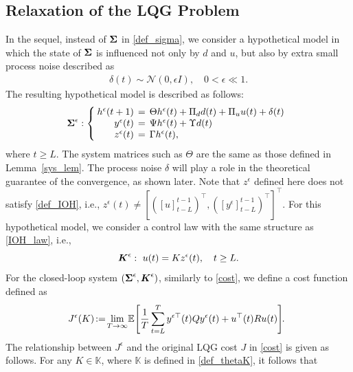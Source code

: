 \documentclass[preprint,5p,times,twocolumn]{elsarticle}
\newcommand{\bm}[1]{{\mbox{\boldmath $#1$}}}
\def\h{\hspace{-0.5mm}}
\def\H{\hspace{-1.0mm}}
\def\hH{\hspace{-1.5mm}}
\def\HH{\hspace{-2.0mm}}
\begin{document}
\subsection{Relaxation of the LQG Problem}
In the sequel, instead of ${\bm \Sigma}$ in \eqref{def_sigma}, we consider a hypothetical model in which the state of ${\bm \Sigma}$ is influenced not only by $d$ and $u$, but also by extra small process noise described as 
\begin{align}\label{perturb}
    \delta(t) \sim \mathcal{N}(0, {\epsilon} I), \quad 0 < {\epsilon} \ll 1. 
\end{align}
The resulting hypothetical model is described as follows: 
\begin{equation}\label{def_sigma_relaxed}
\hspace{-2mm} {\bm \Sigma}^{\epsilon} :  \left\{ \H
\begin{array}{rcl}
    h^{\epsilon}(t+1) &\HH = &\HH \Theta h^{\epsilon}(t) + \Pi_d d(t) + \Pi_u u(t) + \delta(t)\\   
    y^{\epsilon}(t)  &\HH = &\HH \Psi h^{\epsilon}(t) + \Upsilon d(t)\\  
    z^{\epsilon}(t)  &\HH = &\HH \Gamma h^{\epsilon}(t), \\
\end{array}\HH \right.
\end{equation}
where $t \geq L$. The system matrices such as $\Theta$ are the same as those defined in Lemma~\ref{sys_lem}. The process noise $\delta$ will play a role in the theoretical guarantee of the convergence, as shown later. Note that $z^{\epsilon}$ defined here does not satisfy \eqref{def_IOH}, i.e., $z^{\epsilon}(t) \ne [([u]^{t-1}_{t-L})^{\top}, ([y^{\epsilon}]^{t-1}_{t-L})^{\top}]^{\top}$. For this hypothetical model, we consider a control law with the same structure as \eqref{IOH_law}, i.e., 
\begin{equation}\label{IOH_law_relaxed}
    {\bm K}^{\epsilon}:~u(t) = Kz^{\epsilon}(t), \quad t \geq L.
\end{equation}
For the closed-loop system $({\bm \Sigma}^{\epsilon}, {\bm K}^{\epsilon})$, similarly to \eqref{cost}, we define a cost function defined as 
\begin{equation}
    \label{cost_relax}
    \hH J^{\epsilon}(K) \h :=\h \lim_{T \rightarrow \infty}\h {\mathbb E}\h
    \left[\frac{1}{T} 
    \sum_{t=L}^{T}y^{\epsilon\top}(t)Qy^{\epsilon}(t) + u^{\top}(t)Ru(t) \right]\H.
\end{equation}
The relationship between $J^{\epsilon}$ and the original LQG cost $J$ in \eqref{cost} is given as follows. For any $K \in \mathbb{K}$, where $\mathbb{K}$ is defined in \eqref{def_thetaK}, it follows that
\end{document}
